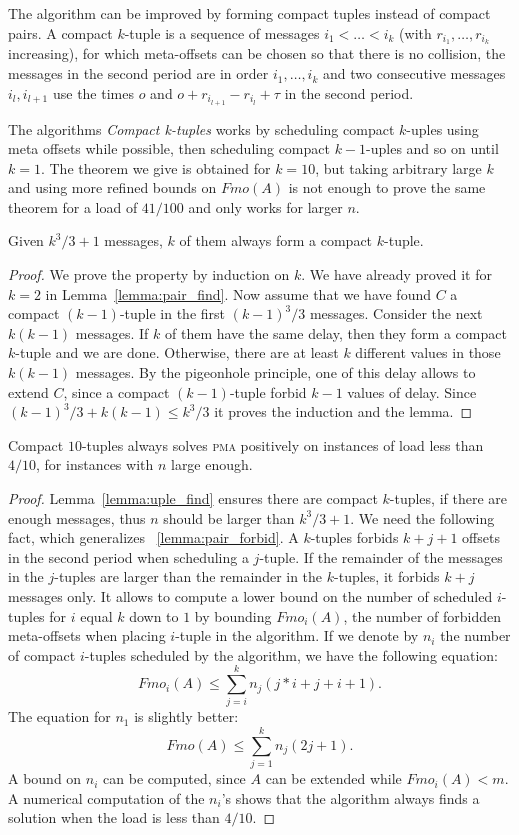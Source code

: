 \documentclass[a4paper,UKenglish,cleveref, autoref, thm-restate]{lipics-v2019}
\newcommand\pma{\textsc{pma}\xspace}
\begin{document}
The algorithm can be improved by forming compact tuples instead of compact pairs.
A compact $k$-tuple is a sequence of messages $i_1 < \dots < i_k$ (with $r_{i_1},\dots,r_{i_k}$ increasing), for which meta-offsets can be chosen so that there is no collision,
the messages in the second period are in order $i_1,\dots,i_k$ and two consecutive messages $i_{l},i_{l+1}$ use the times $o$ and $o + r_{i_{l+1}} -r_{i_{l}} + \tau$ in the second period.

The algorithms \emph{Compact k-tuples} works by scheduling compact $k$-uples
using meta offsets while possible, then scheduling compact $k-1$-uples and so on until $k=1$.
The theorem we give is obtained for $k=10$, but taking arbitrary large $k$ and using more refined bounds on $Fmo(A)$ is not enough to prove the same theorem for a load of $41/100$ and only works for larger $n$.


\begin{lemma}\label{lemma:uple_find}
Given $k^3/3 + 1$ messages, $k$ of them always form a compact $k$-tuple. 
\end{lemma}
\begin{proof}
We prove the property by induction on $k$. We have already proved it for $k=2$ in Lemma~\ref{lemma:pair_find}.
Now assume that we have found $C$ a compact $(k-1)$-tuple in the first $(k-1)^3/3$
messages. Consider the next $k(k-1)$ messages. If $k$ of them have the same delay,
then they form a compact $k$-tuple and we are done. Otherwise, there are at least $k$ different values
in those $k(k-1)$ messages. By the pigeonhole principle, one of this delay allows to extend $C$, since 
a compact $(k-1)$-tuple forbid $k-1$ values of delay. Since $(k-1)^3/3 + k(k-1) \leq k^3/3$ it proves the induction and the lemma.
\end{proof}


\begin{theorem}
Compact $10$-tuples always solves \pma positively on instances of load less than $4/10$, for instances with $n$ large enough.
\end{theorem}
\begin{proof}
Lemma~\ref{lemma:uple_find} ensures there are compact $k$-tuples, if there are enough messages,
thus $n$ should be larger than $k^3/3 +1$. 
We need the following fact, which generalizes ~\ref{lemma:pair_forbid}. A $k$-tuples forbids $k+j+1$ offsets in the second period when scheduling a $j$-tuple. If the remainder of the messages in the $j$-tuples are larger than the remainder in the $k$-tuples, it forbids $k+j$ messages only.
It allows to compute a lower bound on the number of scheduled $i$-tuples for $i$ equal $k$ down to $1$ by bounding $Fmo_i(A)$, the number of forbidden meta-offsets when placing $i$-tuple in the algorithm.
If we denote by $n_i$ the number of compact $i$-tuples scheduled by the algorithm,
we have the following equation:  $$ Fmo_i(A) \leq \displaystyle{\sum_{j=i}^k n_j(j*i + j + i+ 1)}.$$
The equation for $n_1$ is slightly better: 
$$ Fmo(A) \leq \displaystyle{\sum_{j=1}^k n_j(2j + 1)}.$$
A bound on $n_i$ can be computed, since $A$ can be extended while $Fmo_i(A) < m$. A numerical computation of the $n_i$'s shows that the algorithm always finds a solution when the load is less than $4/10$.
\end{proof}
\end{document}
